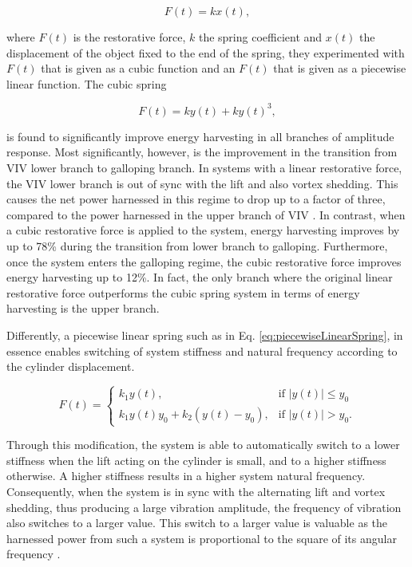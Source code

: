 \documentclass[oneside]{utmthesis}
\begin{document}
\begin{equation}
  F(t) = k x(t),
  \label{eq:linearSpring}
\end{equation}

\noindent where $F(t)$ is the restorative force, $k$ the spring coefficient and $x(t)$ the displacement of the object fixed to the end of the spring, they experimented with $F(t)$ that is given as a cubic function and an $F(t)$ that is given as a piecewise linear function. The cubic spring

\begin{equation}
  F(t) = k y(t) + k y(t)^{3},
  \label{eq:cubicSpring}
\end{equation}

\noindent is found to significantly improve energy harvesting in all branches of amplitude response. Most significantly, however, is the improvement in the transition from VIV lower branch to galloping branch. In systems with a linear restorative force, the VIV lower branch is out of sync with the lift and also vortex shedding. This causes the net power harnessed in this regime to drop up to a factor of three, compared to the power harnessed in the upper branch of VIV \citep{Sun2018,Ma2018}. In contrast, when a cubic restorative force is applied to the system, energy harvesting improves by up to 78\% during the transition from lower branch to galloping. Furthermore, once the system enters the galloping regime, the cubic restorative force improves energy harvesting up to 12\%. In fact, the only branch where the original linear restorative force outperforms the cubic spring system in terms of energy harvesting is the upper branch.

Differently, a piecewise linear spring such as in Eq. \ref{eq:piecewiseLinearSpring}, in essence enables switching of system stiffness and natural frequency according to the cylinder displacement.

\begin{equation}
  F(t)=\begin{cases}
    k_{1} y(t),                              & \text{if $|y(t)| \leq y_{0}$}\\
    k_{1} y(t) y_{0} + k_{2} (y(t) - y_{0}), & \text{if $|y(t)| > y_{0}$}.
  \end{cases}
  \label{eq:piecewiseLinearSpring}
\end{equation}

\noindent Through this modification, the system is able to automatically switch to a lower stiffness when the lift acting on the cylinder is small, and to a higher stiffness otherwise. A higher stiffness results in a higher system natural frequency. Consequently, when the system is in sync with the alternating lift and vortex shedding, thus producing a large vibration amplitude, the frequency of vibration also switches to a larger value. This switch to a larger value is valuable as the harnessed power from such a system is proportional to the square of its angular frequency \citep{Ma2018}.
\end{document}
